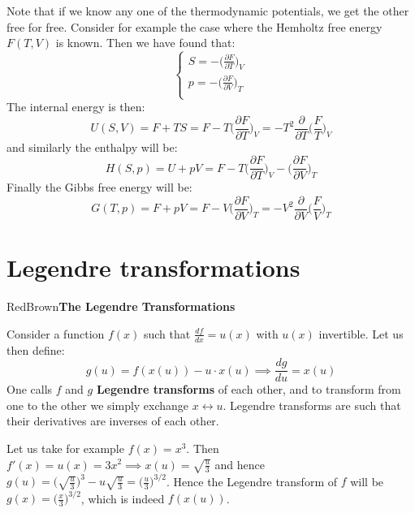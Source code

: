 \documentclass[a4paper,11pt,oneside]{book}
\begin{document}
Note that if we know any one of the thermodynamic potentials, we get the other free for free. Consider for example the case where the Hemholtz free energy $F(T,V)$ is known. Then we have found that:
\begin{equation}
    \begin{cases}
    S = -\big(\frac{\partial F}{\partial T}\big)_V \\
    p = -\big(\frac{\partial F}{\partial V}\big)_T\\
\end{cases}
\end{equation}
The internal energy is then:
\begin{equation}
    U(S,V) = F+TS = F-T\bigg(\frac{\partial F}{\partial T}\bigg)_V  = -T^2 \frac{\partial}{\partial T}\bigg(\frac{F}{T}\bigg)_V
\end{equation}
and similarly the enthalpy will be:
\begin{equation}
    H(S,p) = U+pV = F-T\bigg(\frac{\partial F}{\partial T}\bigg)_V -\bigg(\frac{\partial F}{\partial V}\bigg)_T
\end{equation}
Finally the Gibbs free energy will be:
\begin{equation}
    G(T,p) = F+pV = F-V\bigg(\frac{\partial F}{\partial V}\bigg)_T = -V^2 \frac{\partial}{\partial V}\bigg(\frac{F}{V}\bigg)_T
\end{equation}
\section{Legendre transformations}
\begin{mybox}{RedBrown}{\textbf{The Legendre Transformations}}

Consider a function $f(x)$ such that $\frac{df}{dx} = u(x)$ with $u(x)$ invertible. Let us then define:
\begin{equation}
    g(u) = f(x(u)) - u\cdot x(u)  \implies \frac{dg}{du} = x(u)
\end{equation}
One calls $f$ and $g$ \textbf{Legendre transforms} of each other, and to transform from one to the other we simply exchange $x \longleftrightarrow u$. Legendre transforms are such that their derivatives are inverses of each other.
\end{mybox}

Let us take for example $f(x) = x^3$. Then $f'(x) = u(x)=3x^2 \implies x(u) = \sqrt{\frac{u}{3}}$ and hence $g(u) =\Big(\sqrt{\frac{u}{3}}\Big)^3-u\sqrt{\frac{u}{3}} = \big(\frac{u}{3}\big)^{3/2}$. Hence the Legendre transform of $f$ will be $g(x) = \big(\frac{x}{3}\big)^{3/2}$, which is indeed $f(x(u))$.  
\end{document}
